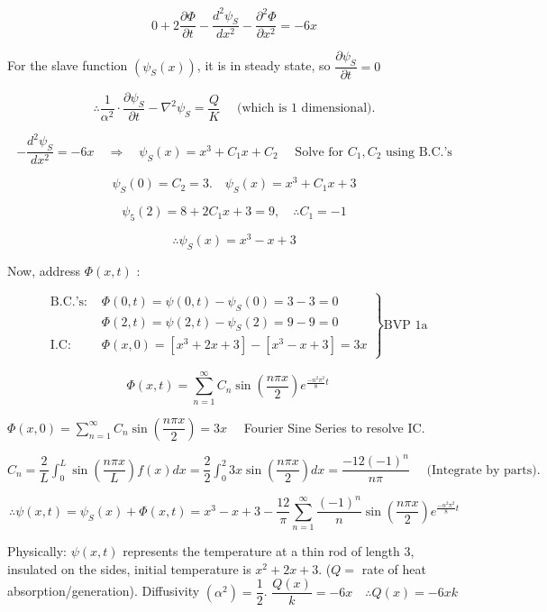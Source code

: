 \documentclass{report}
\begin{document}
$$
0+2 \dfrac{\partial \Phi}{\partial t}-\dfrac{d^{2} \psi_{S}}{d x^{2}}-\dfrac{\partial^{2} \Phi}{\partial x^{2}}=-6 x
$$

For the slave function $\left(\psi_{S}(x)\right)$, it is in steady state, so $\dfrac{\partial \psi_{S}}{\partial t}=0$

$$\therefore \dfrac{1}{\alpha^{2}}\cdot \dfrac{\partial \psi_{S}}{\partial t}-\nabla^{2} \psi_{S}=\frac{Q}{K} \quad \text { (which is 1 dimensional).}$$

$$-\dfrac{d^{2} \psi_{S}}{d x^{2}}=- 6 x\quad \Rightarrow\quad \psi_{S}(x)=x^{3}+C_{1} x+C_{2} \quad \text { Solve for $C_1,C_2$  using B.C.'s}$$


$$\psi_{S}(0)=C_{2}=3 . \quad \psi_{S}(x)=x^{3}+C_{1} x+3$$

$$\psi_{5}(2)=8+2 C_{1} x+3=9, \quad \therefore C_{1}=-1$$

$$
\therefore \psi_{S}(x)=x^{3}-x+3
$$

Now, address $\Phi(x, t)$ :

$$
\left.\begin{array}{rl}
\text { B.C.'s: } & \Phi(0, t)=\psi(0, t)-\psi_{S}(0)=3-3=0 \\
& \Phi(2, t)=\psi(2, t)-\psi_{S}(2)=9-9=0 \\
\text { I.C: } & \Phi(x, 0)=\left[x^{3}+2 x+3\right]-\left[x^{3}-x+3\right]=3 x
\end{array}\right\} \text{BVP 1a}
$$

$$
\Phi(x, t)=\sum\limits_{n=1}^{\infty} C_{n} \sin \left(\dfrac{n \pi x}{2}\right)e^{\frac{-n^{2} \pi^{2}}{8} t}\quad
$$

$\Phi(x, 0)=\sum\limits_{n=1}^{\infty} C_{n} \sin \left(\dfrac{n \pi x}{2}\right)=3 x \quad$ Fourier Sine Series to resolve IC.

$C_{n}=\dfrac{2}{L}\displaystyle\int_0^L \sin \left(\dfrac{n \pi x}{L}\right) f(x) d x=\dfrac{2}{2} \displaystyle\int_{0}^{2} 3 x \sin \left(\dfrac{n \pi x}{2}\right) d x=\dfrac{-12(-1)^{n}}{n \pi}\quad \text { (Integrate by parts). }$

$$
\therefore \psi(x, t)=\psi_{S}(x)+\Phi(x, t)=x^{3}-x+3-\dfrac{12}{\pi} \sum\limits_{n=1}^{\infty} \dfrac{(-1)^{n}}{n} \sin \left(\dfrac{n \pi x}{2}\right) e^{\frac{-n^{2} \pi^{2}}{8} t}
$$

Physically: $\psi(x, t)$ represents the temperature at a thin rod of length 3, insulated on the sides, initial temperature is $x^{2}+2 x+3$. \quad($Q=$ rate of heat absorption/generation). Diffusivity $\left(\alpha^{2}\right)=\dfrac{1}{2}$. $\dfrac{Q(x)}{k}=-6 x \quad \therefore Q(x)=-6 x k$
\end{document}
